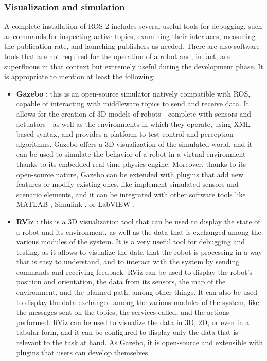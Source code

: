 \subsubsection{Visualization and simulation}
\label{sec:ros2_sim}
A complete installation of ROS 2 includes several useful tools for debugging, such as commands for inspecting active topics, examining their interfaces, measuring the publication rate, and launching publishers as needed. There are also software tools that are not required for the operation of a robot and, in fact, are superfluous in that context but extremely useful during the development phase. It is appropriate to mention at least the following:
\begin{itemize}
  \item \textbf{Gazebo} \cite{open_robotics_gazebo_nodate}: this is an open-source simulator natively compatible with ROS, capable of interacting with middleware topics to send and receive data. It allows for the creation of 3D models of robots—complete with sensors and actuators—as well as the environments in which they operate, using XML-based syntax, and provides a platform to test control and perception algorithms. Gazebo offers a 3D visualization of the simulated world, and it can be used to simulate the behavior of a robot in a virtual environment thanks to its embedded real-time physics engine. Moreover, thanks to its open-source nature, Gazebo can be extended with plugins that add new features or modify existing ones, like implement simulated sensors and scenario elements, and it can be integrated with other software tools like MATLAB \cite{mathworks_matlab_nodate}, Simulink \cite{mathworks_simulink_nodate}, or LabVIEW \cite{national_instruments_labview_nodate}.
  \item \textbf{RViz} \cite{open_robotics_rviz_nodate}: this is a 3D visualization tool that can be used to display the state of a robot and its environment, as well as the data that is exchanged among the various modules of the system. It is a very useful tool for debugging and testing, as it allows to visualize the data that the robot is processing in a way that is easy to understand, and to interact with the system by sending commands and receiving feedback. RViz can be used to display the robot's position and orientation, the data from its sensors, the map of the environment, and the planned path, among other things. It can also be used to display the data exchanged among the various modules of the system, like the messages sent on the topics, the services called, and the actions performed. RViz can be used to visualize the data in 3D, 2D, or even in a tabular form, and it can be configured to display only the data that is relevant to the task at hand. As Gazebo, it is open-source and extensible with plugins that users can develop themselves.
\end{itemize}

